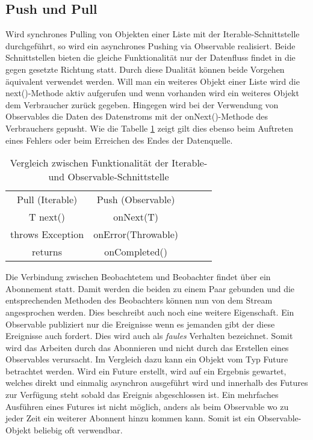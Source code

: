 \subsection{Push und Pull}
Wird synchrones Pulling von Objekten einer Liste mit der Iterable-Schnittstelle durchgeführt, so wird ein asynchrones Pushing via Observable realisiert. Beide Schnittstellen bieten die gleiche Funktionalität nur der Datenfluss findet in die gegen gesetzte Richtung statt. Durch diese Dualität können beide Vorgehen äquivalent verwendet werden. Will man ein weiteres Objekt einer Liste wird die next()-Methode aktiv aufgerufen und wenn vorhanden wird ein weiteres Objekt dem Verbraucher zurück gegeben. Hingegen wird bei der Verwendung von Observables die Daten des Datenstroms mit der onNext()-Methode des Verbrauchers gepusht. Wie die Tabelle \ref{tbl.vglIterObs} zeigt gilt dies ebenso beim Auftreten eines Fehlers oder beim Erreichen des Endes der Datenquelle.
\begin{table}[]
	\centering
	\begin{tabular}{|c|c|lll}
		\cline{1-2}
		\cellcolor[HTML]{C0C0C0}Pull (Iterable) & \cellcolor[HTML]{C0C0C0}Push (Observable) &  &  &  \\ \cline{1-2}
		T next()                                & onNext(T)                                 &  &  &  \\ \cline{1-2}
		throws Exception                        & onError(Throwable)                        &  &  &  \\ \cline{1-2}
		returns                                 & onCompleted()                             &  &  &  \\ \cline{1-2}
	\end{tabular}
	\caption{Vergleich zwischen Funktionalität der Iterable- und Observable-Schnittstelle}
	\label{tbl.vglIterObs}
\end{table}
Die Verbindung zwischen Beobachtetem und Beobachter findet über ein Abonnement statt. Damit werden die beiden zu einem Paar gebunden und die entsprechenden Methoden des Beobachters können nun von dem Stream angesprochen werden. Dies beschreibt auch noch eine weitere Eigenschaft. Ein Observable publiziert nur die Ereignisse wenn es jemanden gibt der diese Ereignisse auch fordert. Dies wird auch als \textit{faules} Verhalten bezeichnet. Somit wird das Arbeiten durch das Abonnieren und nicht durch das Erstellen eines Observables verursacht. Im Vergleich dazu kann ein Objekt vom Typ Future betrachtet werden. Wird ein Future erstellt, wird auf ein Ergebnis gewartet, welches direkt und einmalig asynchron ausgeführt wird und innerhalb des Futures zur Verfügung steht sobald das Ereignis abgeschlossen ist. Ein mehrfaches Ausführen eines Futures ist nicht möglich, anders als beim Observable wo zu jeder Zeit ein weiterer Abonnent hinzu kommen kann. Somit ist ein Observable-Objekt beliebig oft verwendbar. 
